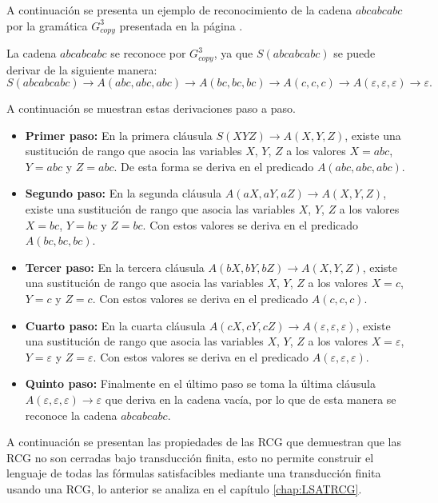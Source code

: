 A continuación se presenta un ejemplo de reconocimiento de la cadena $abcabcabc$ por la gramática $G^3_{copy}$
presentada en la página \pageref{g_3copy}.

La cadena $abcabcabc$ se reconoce por $G^3_{copy}$, ya que $S(abcabcabc)$ se puede derivar de la siguiente manera:
$$S(abcabcabc)\to A(abc,abc,abc)\to A(bc,bc,bc)\to A(c,c,c)\to A(\varepsilon,\varepsilon,\varepsilon)\to \varepsilon.$$

A continuación se muestran estas derivaciones paso a paso.

\begin{itemize}
    \item \textbf{Primer paso:} En la primera cláusula $S(XYZ)\to A(X,Y,Z)$, existe una sustitución de rango que asocia las variables $X$, $Y$, $Z$ a los valores $X=abc$, $Y=abc$ y $Z=abc$. De esta forma se deriva en el predicado $A(abc,abc,abc)$.
    \item \textbf{Segundo paso:} En la segunda cláusula $A(aX,aY,aZ)\to A(X,Y,Z)$, existe una sustitución de rango que asocia las
          variables $X$, $Y$, $Z$ a los valores $X=bc$, $Y=bc$ y $Z=bc$. Con estos valores se deriva en el predicado $A(bc,bc,bc)$.
    \item \textbf{Tercer paso:} En la tercera cláusula $A(bX,bY,bZ)\to A(X,Y,Z)$, existe una sustitución de rango que asocia las
          variables $X$, $Y$, $Z$ a los valores $X=c$, $Y=c$ y $Z=c$. Con estos valores se deriva en el predicado $A(c,c,c)$.
    \item \textbf{Cuarto paso:} En la cuarta cláusula $A(cX,cY,cZ)\to A(\varepsilon,\varepsilon,\varepsilon)$, existe una sustitución de rango que asocia las variables $X$, $Y$, $Z$ a los valores $X=\varepsilon$, $Y=\varepsilon$ y $Z=\varepsilon$. Con estos valores se deriva en el predicado $A(\varepsilon,\varepsilon,\varepsilon)$.
    \item \textbf{Quinto paso:} Finalmente en el último paso se toma la última
          cláusula $A(\varepsilon,\varepsilon,\varepsilon)\to \varepsilon$ que deriva en la cadena vacía, por lo que de esta manera se reconoce la cadena $abcabcabc$.
\end{itemize}


A continuación se presentan las propiedades de las RCG que demuestran
que las RCG no son cerradas bajo transducción finita, esto no permite construir el lenguaje de todas las fórmulas
satisfacibles mediante una transducción finita usando una RCG, lo anterior se analiza en el capítulo \ref{chap:LSATRCG}.

